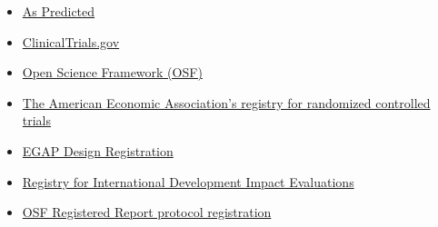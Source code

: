 \documentclass[
  oneside]{book}
\providecommand{\tightlist}{%
  \setlength{\itemsep}{0pt}\setlength{\parskip}{0pt}}
\begin{document}
\begin{itemize}
\tightlist
\item
  \href{https://aspredicted.org/}{As Predicted}
\item
  \href{https://clinicaltrials.gov/}{ClinicalTrials.gov}
\item
  \href{https://osf.io}{Open Science Framework (OSF)}
\item
  \href{https://www.socialscienceregistry.org/}{The American Economic Association's registry for randomized controlled trials}
\item
  \href{https://egap.org/registry-0/}{EGAP Design Registration}
\item
  \href{http://ridie.3ieimpact.org/}{Registry for International Development Impact Evaluations}
\item
  \href{https://osf.io/rr/}{OSF Registered Report protocol registration}
\end{itemize}

  
\end{document}
